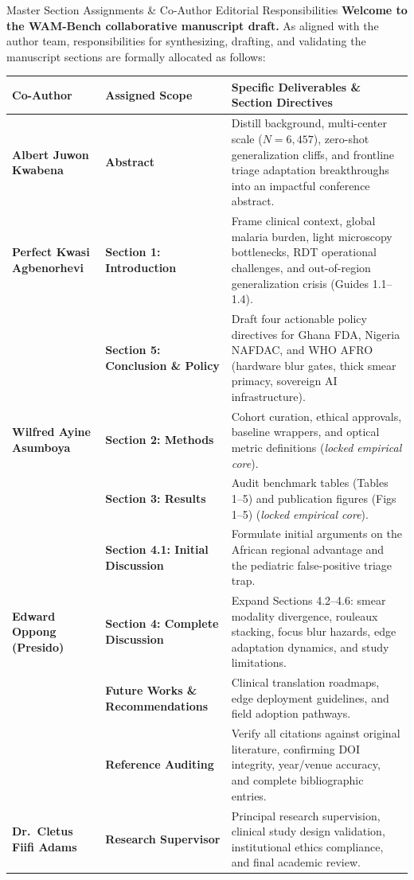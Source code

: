 \documentclass[a4paper,11pt]{article}
\begin{document}
\begin{overviewbox}{Master Section Assignments \& Co-Author Editorial Responsibilities}
\textbf{Welcome to the WAM-Bench collaborative manuscript draft.} As aligned with the author team, responsibilities for synthesizing, drafting, and validating the manuscript sections are formally allocated as follows:
\vspace{0.4em}

\small
\begin{tabularx}{\linewidth}{l l X}
\toprule
\textbf{Co-Author} & \textbf{Assigned Scope} & \textbf{Specific Deliverables \& Section Directives} \\
\midrule
\textbf{Albert Juwon Kwabena} & \textbf{Abstract} & Distill background, multi-center scale ($N = 6,457$), zero-shot generalization cliffs, and frontline triage adaptation breakthroughs into an impactful conference abstract. \\
\addlinespace[3pt]
\textbf{Perfect Kwasi Agbenorhevi} & \textbf{Section 1: Introduction} & Frame clinical context, global malaria burden, light microscopy bottlenecks, RDT operational challenges, and out-of-region generalization crisis (Guides 1.1--1.4). \\
& \textbf{Section 5: Conclusion \& Policy} & Draft four actionable policy directives for Ghana FDA, Nigeria NAFDAC, and WHO AFRO (hardware blur gates, thick smear primacy, sovereign AI infrastructure). \\
\addlinespace[3pt]
\textbf{Wilfred Ayine Asumboya} & \textbf{Section 2: Methods} & Cohort curation, ethical approvals, baseline wrappers, and optical metric definitions (\textit{locked empirical core}). \\
& \textbf{Section 3: Results} & Audit benchmark tables (Tables 1--5) and publication figures (Figs 1--5) (\textit{locked empirical core}). \\
& \textbf{Section 4.1: Initial Discussion} & Formulate initial arguments on the African regional advantage and the pediatric false-positive triage trap. \\
\addlinespace[3pt]
\textbf{Edward Oppong (Presido)} & \textbf{Section 4: Complete Discussion} & Expand Sections 4.2--4.6: smear modality divergence, rouleaux stacking, focus blur hazards, edge adaptation dynamics, and study limitations. \\
& \textbf{Future Works \& Recommendations} & Clinical translation roadmaps, edge deployment guidelines, and field adoption pathways. \\
& \textbf{Reference Auditing} & Verify all citations against original literature, confirming DOI integrity, year/venue accuracy, and complete bibliographic entries. \\
\addlinespace[3pt]
\textbf{Dr.~Cletus Fiifi Adams} & \textbf{Research Supervisor} & Principal research supervision, clinical study design validation, institutional ethics compliance, and final academic review. \\
\bottomrule
\end{tabularx}
\normalsize
\end{overviewbox}
\end{document}
